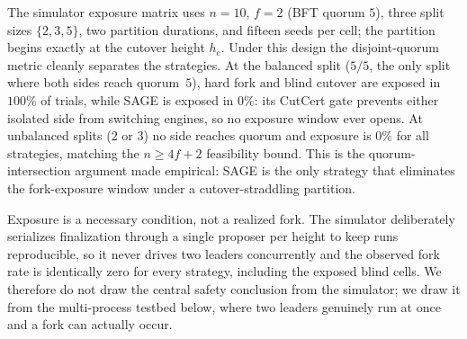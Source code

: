 \documentclass[journal]{IEEEtran}
\begin{document}
The simulator exposure matrix uses $n{=}10$, $f{=}2$ (BFT quorum $5$), three split sizes
$\{2,3,5\}$, two partition durations, and fifteen seeds per cell; the partition begins exactly at
the cutover height $h_{\mathrm{c}}$. Under this design the disjoint-quorum metric cleanly
separates the strategies. At the balanced split ($5/5$, the only split where both sides reach
quorum~$5$), hard fork and blind cutover are exposed in $100\%$ of trials, while SAGE is exposed
in $0\%$: its CutCert gate prevents either isolated side from switching engines, so no exposure
window ever opens. At unbalanced splits ($2$ or $3$) no side reaches quorum and exposure is $0\%$
for all strategies, matching the $n\ge 4f{+}2$ feasibility bound. This is the quorum-intersection
argument made empirical: SAGE is the only strategy that eliminates the fork-exposure window under
a cutover-straddling partition.

Exposure is a necessary condition, not a realized fork. The simulator deliberately serializes
finalization through a single proposer per height to keep runs reproducible, so it never drives
two leaders concurrently and the observed fork rate is identically zero for every strategy,
including the exposed blind cells. We therefore do not draw the central safety conclusion from the
simulator; we draw it from the multi-process testbed below, where two leaders genuinely run at
once and a fork can actually occur.
\end{document}
